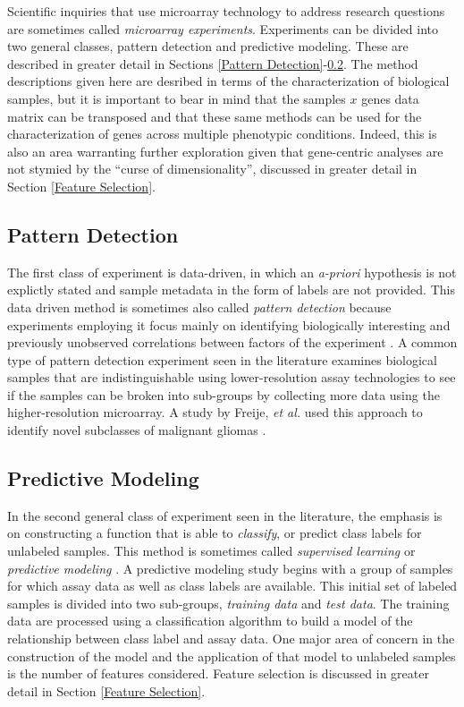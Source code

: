 Scientific inquiries that use microarray technology to address research
questions are sometimes called \emph{microarray experiments}.  Experiments can
be divided into two general classes, pattern detection and predictive modeling.
These are described in greater detail in Sections \ref{Pattern
Detection}-\ref{Predictive Modeling}.  The method descriptions given here are
desribed in terms of the characterization of biological samples, but it is
important to bear in mind that the samples $x$ genes data matrix can be
transposed and that these same methods can be used for the characterization of
genes across multiple phenotypic conditions.  Indeed, this is also an area
warranting further exploration given that gene-centric analyses are not stymied
by the ``curse of dimensionality'', discussed in greater detail in Section
\ref{Feature Selection}.

\subsection{Pattern Detection}
\label{Pattern Detection}

The first class of experiment is data-driven, in which an \emph{a-priori}
hypothesis is not explictly stated and sample metadata in the form of labels
are not provided.  This data driven method is sometimes also called
\emph{pattern detection} because experiments employing it focus mainly on
identifying biologically interesting and previously unobserved correlations
between factors of the experiment \cite{Dubitzky2003IMD}.  A common type of
pattern detection experiment seen in the literature examines biological samples
that are indistinguishable using lower-resolution assay technologies to see if
the samples can be broken into sub-groups by collecting more data using the
higher-resolution microarray.   A study by Freije, \emph{et al.} used this
approach to identify novel subclasses of malignant gliomas
\cite{PMID_15374961}.

\subsection{Predictive Modeling}
\label{Predictive Modeling}

In the second general class of experiment seen in the literature, the emphasis
is on constructing a function that is able to \emph{classify}, or predict class
labels for unlabeled samples.  This method is sometimes called \emph{supervised
learning} or \emph{predictive modeling} \cite{Dubitzky2003IMD}.  A predictive
modeling study begins with a group of samples for which assay data as well as
class labels are available.  This initial set of labeled samples is divided
into two sub-groups, \emph{training data} and \emph{test data}.  The
training data are processed using a classification algorithm to build a model
of the relationship between class label and assay data.  One major area of
concern in the construction of the model and the application of that model to
unlabeled samples is the number of features considered.  Feature selection is
discussed in greater detail in Section \ref{Feature Selection}.

